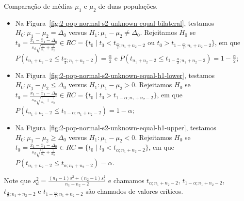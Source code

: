 \documentclass[9pt]{beamer}
\begin{document}
\begin{frame}{Comparação de médias $\mu_1$ e $\mu_2$ de duas populações.}

\begin{itemize}
	\item Na Figura~\ref{fig:2-pop-normal-s2-unknown-equal-bilateral}, testamos $H_0: \mu_1 - \mu_2 = \Delta_0$ versus $H_1: \mu_1 - \mu_2 \neq \Delta_0$. Rejeitamos $H_0$ se $t_0 = \frac{\bar{x}_1 - \bar{x}_1 - \Delta_0}{ s_d\sqrt{ \frac{1}{n_1} + \frac{1}{n_2} } } \in  RC=\{t_0 \mid t_0 < t_{\frac{\alpha}{2};n_1+n_2-2} \allowbreak \mbox{ ou } t_0 > t_{1-\frac{\alpha}{2};n_1+n_2-2} \}$, em que $P\left(t_{n_1+n_2-2} \leq t_{\frac{\alpha}{2}; n_1+n_2-2} \right) = \frac{\alpha}{2}$ e $P\left(t_{n_1+n_2-2} \leq t_{1-\frac{\alpha}{2}; n_1+n_2-2} \right) = 1 - \frac{\alpha}{2}$;
	\vfill
	
	\item Na Figura~\ref{fig:2-pop-normal-s2-unknown-equal-h1-lower}, testamos $H_0: \mu_1 - \mu_2 \leq \Delta_0 $ versus $H_1: \mu_1 - \mu_2 > 0$. Rejeitamos $H_0$ se $t_0 = \frac{\bar{x}_1 - \bar{x}_1 - \Delta_0}{ s_d\sqrt{ \frac{1}{n_1} + \frac{1}{n_2} } } \in \allowbreak RC=\{t_0 \mid t_0 > t_{1-\alpha; n_1+n_2-2}  \}$, em que $P\left(t_{n_1+n_2-2} \leq  t_{1-\alpha;n_1+n_2-2} \right) =1- \alpha$;
	\vfill
	
	\item Na Figura~\ref{fig:2-pop-normal-s2-unknown-equal-h1-upper}, testamos $H_0: \mu_1 - \mu_2 \geq \Delta_0$ versus $H_1: \mu_1 - \mu_2  < 0$. Rejeitamos $H_0$ se $t_0 = \frac{\bar{x}_1 - \bar{x}_1 - \Delta_0}{ s_d\sqrt{ \frac{1}{n_1} + \frac{1}{n_2} } } \in \allowbreak RC=\{t_0 \mid t_0 < t_{\alpha;n_1+n_2-2}  \}$, em que $P\left(t_{n_1+n_2-2} \leq t_{\alpha;n_1+n_2-2} \right) = \alpha$.
\end{itemize}
Note que $s_d^2 = \frac{(n_1-1) s_1^2 + (n_2-1) s_2^2}{n_1+n_2-2}$ e chamamos $t_{\alpha;n_1+n_2-2}$, $t_{1-\alpha;n_1+n_2-2}$, $t_{\frac{\alpha}{2};n_1+n_2-2}$ e $t_{1-\frac{\alpha}{2};n_1+n_2-2}$ são chamados de valores críticos.
\end{frame}
\end{document}
